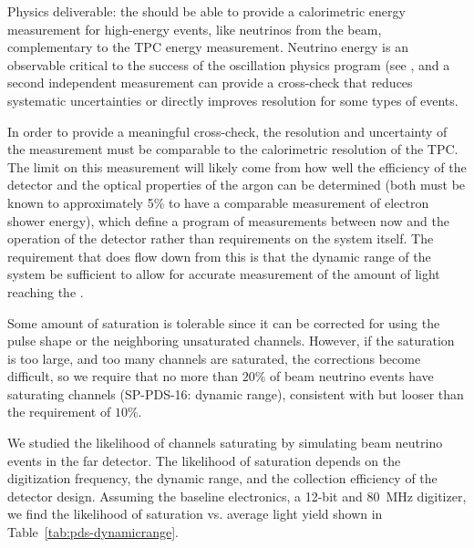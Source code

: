 Physics deliverable: the  should be able to provide a calorimetric energy measurement for high-energy events, like neutrinos from the  beam, complementary to the TPC energy measurement.
Neutrino energy is an observable critical to the success of the oscillation physics program (see \physchlbl{}, %
and a second independent measurement can provide a cross-check that reduces systematic uncertainties or directly improves resolution for some types of events. 

In order to provide a meaningful cross-check, the resolution and uncertainty of the  measurement must be comparable to the calorimetric resolution of the TPC. The limit on this measurement will likely come from how well the efficiency of the detector and the optical properties of the argon can be determined (both must be known to approximately 5\% to have a comparable measurement of electron shower energy), which define a program of measurements between now and the operation of the detector rather than requirements on the system itself. The requirement that does flow down from this is that the dynamic range of the system be sufficient to allow for accurate measurement of the amount of light reaching the . 


Some amount of saturation is tolerable since it can be corrected for using the pulse shape or the neighboring unsaturated channels. However, if the saturation is too large, and too many channels are saturated, the corrections become difficult, so we require that no more than $20\%$ of beam neutrino events have saturating channels (SP-PDS-16: dynamic range), consistent with but looser than the  requirement of $10\%$.

We studied the likelihood of channels saturating by simulating beam neutrino events in the far detector. The likelihood of saturation depends on the digitization frequency, the dynamic range, and the collection efficiency of the detector design. Assuming the baseline electronics, a 12-bit and \SI{80}{MHz} digitizer, we find the likelihood of saturation vs. average light yield shown in Table~\ref{tab:pds-dynamicrange}. 

